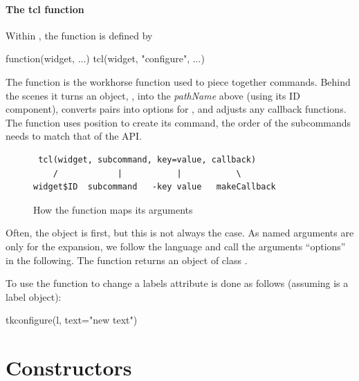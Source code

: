 \paragraph{The tcl function} Within , the  function is defined by

\begin{Sinput}
function(widget, ...) tcl(widget, "configure", ...)
\end{Sinput}

The  function is the workhorse function used to piece
together \TCL\/ commands.  Behind the scenes it turns an \R\/ object,
, into the \textit{pathName} above (using its ID component),
converts \R\/  pairs into  options for
\TCL, and adjusts any callback functions. The  function
uses position to create its command, the order of the subcommands
needs to match that of the \TK\/ API. 

\begin{figure}
  \centering
\begin{verbatim}
 tcl(widget, subcommand, key=value, callback)
    /            |           |           \
widget$ID  subcommand   -key value   makeCallback
\end{verbatim}
  \caption{How the  function maps its arguments}
  \label{fig:tcl-function-map}
\end{figure}

Often, the \R\/ object is first, but
this is not always the case. As named arguments are only for the
\code{-key value} expansion, we follow the \TCL\/ language and call
the arguments ``options'' in the following.  The \function{tcl} function
returns an object of class \code{tclObj}.

To use the  function to change a labels 
attribute is done as follows (assuming \code{l} is a label object):


\begin{Schunk}
\begin{Sinput}
 tkconfigure(l, text="new text")
\end{Sinput}
\end{Schunk}




\section{Constructors}
\label{sec:tcltk:constructors}

